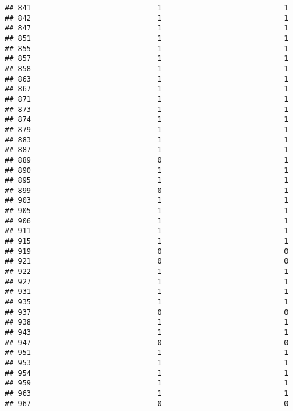 \documentclass[
]{article}
\begin{document}
\begin{verbatim}
## 841                             1                            1
## 842                             1                            1
## 847                             1                            1
## 851                             1                            1
## 855                             1                            1
## 857                             1                            1
## 858                             1                            1
## 863                             1                            1
## 867                             1                            1
## 871                             1                            1
## 873                             1                            1
## 874                             1                            1
## 879                             1                            1
## 883                             1                            1
## 887                             1                            1
## 889                             0                            1
## 890                             1                            1
## 895                             1                            1
## 899                             0                            1
## 903                             1                            1
## 905                             1                            1
## 906                             1                            1
## 911                             1                            1
## 915                             1                            1
## 919                             0                            0
## 921                             0                            0
## 922                             1                            1
## 927                             1                            1
## 931                             1                            1
## 935                             1                            1
## 937                             0                            0
## 938                             1                            1
## 943                             1                            1
## 947                             0                            0
## 951                             1                            1
## 953                             1                            1
## 954                             1                            1
## 959                             1                            1
## 963                             1                            1
## 967                             0                            0

\end{verbatim}
\end{document}

